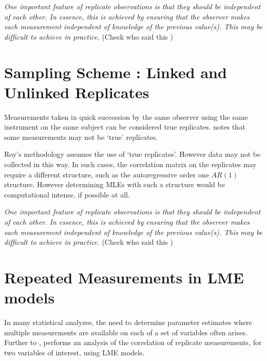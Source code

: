 \documentclass[12pt, a4paper]{report}
\theoremstyle{plain}
\theoremstyle{definition}
\theoremstyle{remark}
\begin{document}
	
	
	\emph{
		One important feature of replicate observations is that they should be independent
		of each other. In essence, this is achieved by ensuring that the observer makes each
		measurement independent of knowledge of the previous value(s). This may be difficult
		to achieve in practice.} (Check who said this
	)
	
	
	\section{Sampling Scheme : Linked and Unlinked Replicates}
	Measurements taken in quick succession by the same observer using the same instrument on the same subject can be considered true replicates. \citet{ARoy2009} notes that some measurements may not be `true' replicates.
	
	Roy's methodology assumes the use of `true replicates'. However data may not be collected in this way. In such cases, the correlation matrix on the replicates may require a different structure, such as the autoregressive order one $AR(1)$ structure. However determining MLEs with such a structure would be computational intense, if possible at all.
	
	
	
	\emph{
		One important feature of replicate observations is that they should be independent
		of each other. In essence, this is achieved by ensuring that the observer makes each
		measurement independent of knowledge of the previous value(s). This may be difficult
		to achieve in practice.} (Check who said this
	)
	
	

	\section{Repeated Measurements in LME models}
	
	In many statistical analyzes, the need to determine parameter estimates where multiple measurements are available on each of a set of variables often arises. Further to \citet{lam}, \citet{hamlett} performs an analysis of the correlation of replicate measurements, for two variables of interest, using LME models.
	
\end{document}

